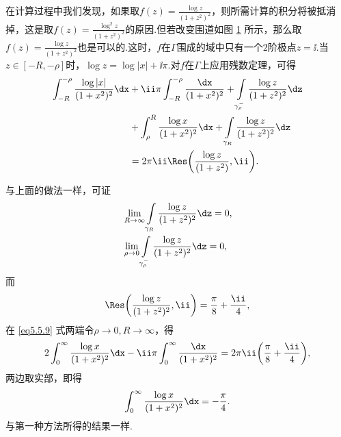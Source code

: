 \begin{solution}
在计算过程中我们发现，如果取$f(z)=\frac{\log z}{(1+z^2)^2}$，则所需计算的积分将被抵消掉，这是取$f(z)=\frac{\log^2z}{(1+z^2)^2}$的原因.但若改变围道如图 \ref{fig5.5} 所示，那么取$f(z)=\frac{\log z}{(1+z^2)^2}$也是可以的.这时，$f$在$\Gamma$围成的域中只有一个$2$阶极点$z=\ii$.当$z\in[-R,-\rho]$时，$\log z=\log |x|+\ii\pi$.对$f$在$\Gamma$上应用残数定理，可得
\begin{equation}\label{eq5.5.9}
\begin{aligned}
\int_{-R}^{-\rho}\frac{\log|x|}{(1+x^2)^2}\dx&+\ii\pi\int_{-R}^{-\rho}\frac{\dx}{(1+x^2)^2}
+\int\limits_{\gamma_\rho^-}\frac{\log z}{(1+z^2)^2}\dz\\
&+\int_\rho^R\frac{\log x}{(1+x^2)^2}\dx+\int\limits_{\gamma_R}\frac{\log z}{(1+z^2)^2}\dz\\
&=2\pi\ii \Res\bigg(\frac{\log z}{(1+z^2)},\ii\bigg).
\end{aligned}
\end{equation}
\begin{figure}[!ht]
\centering
{}
\caption{\label{fig5.5}}
\end{figure}
与上面的做法一样，可证
\begin{align*}
&\lim_{R\to\infty}\int\limits_{\gamma_R}\frac{\log z}{(1+z^2)^2}\dz=0,\\
&\lim_{\rho\to0}\int\limits_{\gamma_\rho^-}\frac{\log z}{(1+z^2)^2}\dz=0,
\end{align*}
而
\[\Res\bigg(\frac{\log z}{(1+z^2)^2},\ii\bigg)=\frac\pi8+\frac\ii4,\]
在 \eqref{eq5.5.9} 式两端令$\rho\to0,R\to\infty$，得
\[2\int_0^\infty\frac{\log x}{(1+x^2)^2}\dx-\ii\pi\int_0^\infty\frac{\dx}{(1+x^2)^2}
=2\pi\ii\bigg(\frac\pi8+\frac\ii4\bigg),\]
两边取实部，即得
\[\int_0^\infty\frac{\log x}{(1+x^2)^2}\dx=-\frac\pi4.\]
与第一种方法所得的结果一样.
\end{solution}

